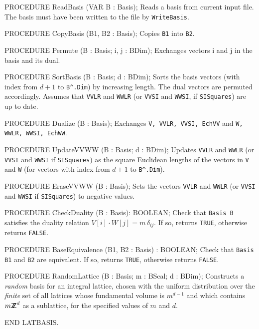PROCEDURE ReadBasis (VAR B : Basis);
\endcode
  \tab  Reads a basis from current input file.
        The basis must have been written to the file by {\tt WriteBasis}.
  \endtab
\code

PROCEDURE CopyBasis (B1, B2 : Basis);
\endcode
 \tab  Copies {\tt B1} into {\tt B2}.  \endtab
\code

PROCEDURE Permute (B : Basis;  i, j : BDim);
\endcode
   \tab Exchanges vectors i and j in the basis and its dual. \endtab
\code

PROCEDURE SortBasis (B : Basis;  d : BDim);
\endcode
   \tab  Sorts the basis vectors (with index from $d+1$ to {\tt B\^{}.Dim}) 
   by increasing length.
   The dual vectors are permuted accordingly.
   Assumes that {\tt VVLR} and {\tt WWLR} 
   (or {\tt VVSI} and {\tt WWSI}, if {\tt SISquares}) are up to date.
 \endtab
\code

PROCEDURE Dualize (B : Basis);
\endcode
  \tab Exchanges {\tt V, VVLR, VVSI, EchVV} and {\tt W, WWLR, WWSI,
       EchWW}.
 \endtab
\code

PROCEDURE UpdateVVWW (B : Basis;  d : BDim);
\endcode
  \tab  Updates {\tt VVLR} and {\tt WWLR} (or {\tt VVSI} and {\tt WWSI}
     if {\tt SISquares}) as the square Euclidean lengths of the vectors
     in {\tt V} and {\tt W} (for vectors 
     with index from $d+1$ to {\tt B\^{}.Dim}).
 \endtab
\code

PROCEDURE EraseVVWW (B : Basis);
\endcode
  \tab
    Sets the vectors {\tt VVLR} and {\tt WWLR} (or {\tt VVSI} and {\tt WWSI}
    if {\tt SISquares}) to negative values. 
\endtab
\code

PROCEDURE CheckDuality (B : Basis): BOOLEAN;
\endcode
  \tab
   Check that {\tt Basis B} satisfies the duality relation
   $V[i]\cdot W[j] = m\,\delta_{ij}$. If so, returns {\tt TRUE}, otherwise 
   returns {\tt FALSE}.
\endtab
\code

PROCEDURE BaseEquivalence (B1, B2 : Basis) : BOOLEAN;
\endcode
  \tab
   Check that {\tt Basis B1} and {\tt B2} are equivalent.
   If so, returns {\tt TRUE}, otherwise returns {\tt FALSE}.
\endtab
\code

PROCEDURE RandomLattice (B : Basis;   m : BScal;   d : BDim);
\endcode
 \tab Constructs a {\em random\/} basis for an integral lattice,
   chosen with the uniform distribution over the {\em finite\/} set
   of all lattices whose fundamental volume is $m^{d-1}$ and which
   contains $m {\sf Z\kern-0.4em Z}^d$ as a sublattice, for the specified values of $m$ and $d$.
 \endtab
\code

END LATBASIS.
\endcode
